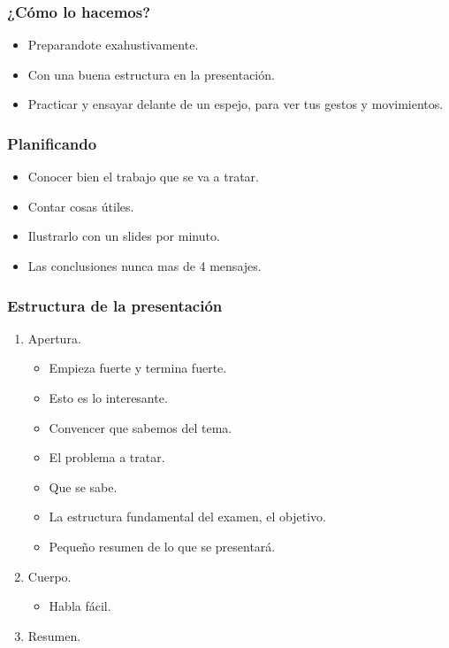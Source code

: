 \subsubsection{¿Cómo lo hacemos?}
\begin{itemize}
    \item Preparandote exahustivamente.
    \item Con una buena estructura en la presentación.
    \item Practicar y ensayar delante de un  espejo, para ver tus gestos y movimientos.
\end{itemize}

\subsubsection{Planificando}
\begin{itemize}
    \item Conocer bien el trabajo que se va a tratar.
    \item Contar cosas útiles.
    \item Ilustrarlo con un slides por minuto.
    \item Las conclusiones nunca mas de 4 mensajes.
\end{itemize}

\subsubsection{Estructura de la presentación}

\begin{enumerate}[\bfseries 1)]
    \item Apertura.
	\begin{itemize}
	    \item Empieza fuerte y termina fuerte.
	    \item Esto es lo interesante.
	    \item Convencer que sabemos del tema.
	    \item El problema a tratar.
	    \item Que se sabe.
	    \item La estructura fundamental del examen, el objetivo.
	    \item Pequeño resumen de lo que se presentará.
	\end{itemize}
    \item Cuerpo.
	\begin{itemize}
	    \item Habla fácil.
	\end{itemize}
    \item Resumen.
\end{enumerate}


